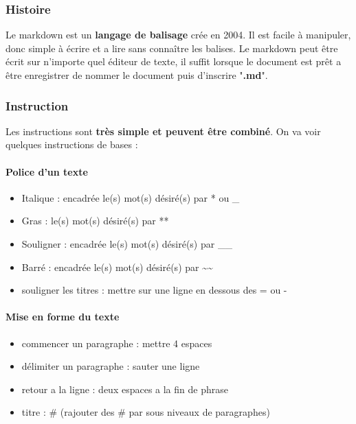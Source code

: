 \subsubsection{Histoire}

Le markdown est un \textbf{langage de balisage} crée en 2004. Il est facile à manipuler, donc simple à écrire et a lire sans connaître les balises.
Le markdown peut être écrit sur n'importe quel éditeur de texte, il suffit lorsque le document est prêt a être enregistrer de nommer le document puis d'inscrire "\textbf{.md}".


\subsubsection{Instruction}

Les instructions sont \textbf{très simple et peuvent être combiné}. 
On va voir quelques instructions de bases : 

\paragraph{Police d'un texte}
\begin{itemize}
	\item Italique : encadrée le(s) mot(s) désiré(s) par * ou \_
	\item Gras :  le(s) mot(s) désiré(s) par **
	\item Souligner : encadrée le(s) mot(s) désiré(s) par \_\_
	\item Barré : encadrée le(s) mot(s) désiré(s) par \~{}\~{}
	\item souligner les titres : mettre sur une ligne en dessous des = ou -
\end{itemize}


\paragraph{Mise en forme du texte}
\begin{itemize}
	\item commencer un paragraphe : mettre 4 espaces
	\item délimiter un paragraphe : sauter une ligne
	\item retour a la ligne : deux espaces a la fin de phrase
	\item titre : \# (rajouter des \# par sous niveaux de paragraphes)
\end{itemize}


